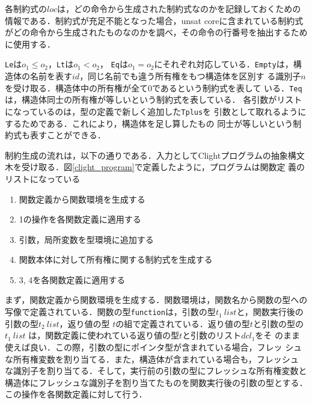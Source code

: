 各制約式の$loc$は，どの命令から生成された制約式なのかを記録しておくための
情報である．制約式が充足不能となった場合，unsat coreに含まれている制約式
がどの命令から生成されたものなのかを調べ，その命令の行番号を抽出するため
に使用する．

\texttt{Le}は$o_{1} \le o_{2}$，\texttt{Lt}は$o_{1} < o_{2}$，
\texttt{Eq}は$o_{1} = o_{2}$にそれぞれ対応している．\texttt{Empty}は，構
造体の名前を表す$\mathit{id}$，同じ名前でも違う所有権をもつ構造体を区別す
る識別子$n$を受け取る．構造体中の所有権が全て0であるという制約式を表して
いる．\texttt{Teq}は，構造体同士の所有権が等しいという制約式を表している．
各引数がリストになっているのは，型の定義で新しく追加した\texttt{Tplus}を
引数として取れるようにするためである．これにより，構造体を足し算したもの
同士が等しいという制約式も表すことができる．

制約生成の流れは，以下の通りである．入力としてClightプログラムの抽象構文
木を受け取る．図\ref{clight_program}で定義したように，プログラムは関数定
義のリストになっている

\begin{enumerate}
  \item 関数定義から関数環境を生成する
  \item 1の操作を各関数定義に適用する
  \item 引数，局所変数を型環境に追加する
  \item 関数本体に対して所有権に関する制約式を生成する
  \item 3, 4を各関数定義に適用する
\end{enumerate}

まず，関数定義から関数環境を生成する．関数環境は，関数名から関数の型への
写像で定義されている．関数の型\texttt{function}は，引数の型$t_{1}\
\mathit{list}$と，関数実行後の引数の型$t_{2}\ \mathit{list}$，返り値の型
$t$の組で定義されている．返り値の型$t$と引数の型の$t_{1}\ \mathit{list}$
は，関数定義に使われている返り値の型$t$と引数のリスト$\mathit{dcl}_1$をそ
のまま使えば良い．この際，引数の型にポインタ型が含まれている場合，フレッ
シュな所有権変数を割り当てる．また，構造体が含まれている場合も，フレッシュ
な識別子を割り当てる．そして，実行前の引数の型にフレッシュな所有権変数と
構造体にフレッシュな識別子を割り当てたものを関数実行後の引数の型とする．
この操作を各関数定義に対して行う．

